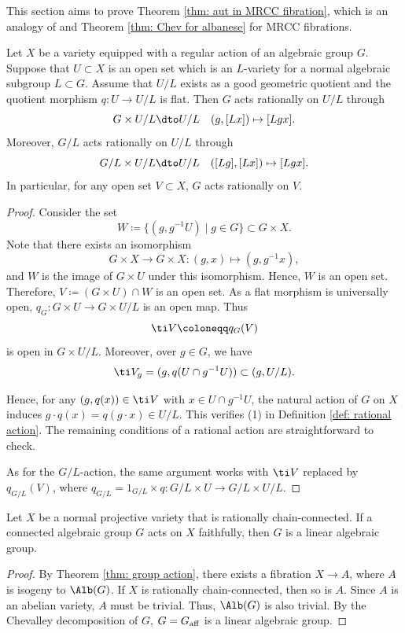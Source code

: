 \documentclass[11pt]{amsart}
\begin{document}
This section aims to prove Theorem \ref{thm: aut in MRCC fibration}, which is an analogy of \cite[Theorem 2]{Mat63} and Theorem \ref{thm: Chev for albanese} for MRCC fibrations.

\begin{lemma}\label{lem: rational action on open set}
Let $X$ be a variety equipped with a regular action of an algebraic group $G$. Suppose that $U\subset X$ is an open set which is an $L$-variety for a normal algebraic subgroup $L\subset G$. Assume that $U/L$ exists as a good geometric quotient and the quotient morphism $q: U \to U/L$ is flat. Then $G$ acts rationally on $U/L$ through
\[
G \times U/L \dto U/L \quad (g, [Lx]) \mapsto [Lgx]. 
\]
Moreover, $G/L$ acts rationally on $U/L$ through
\[
G/L \times U/L \dto U/L \quad ([Lg], [Lx]) \mapsto [Lgx]. 
\]
In particular, for any open set $V \subset X$, $G$ acts rationally on $V$.
\end{lemma}
\begin{proof}
Consider the set
\[
W \coloneqq \{(g, g^{-1}U) \mid g\in G\} \subset G \times X.
\] Note that there exists an isomorphism
\[
G \times X \to G \times X: (g, x) \mapsto (g, g^{-1}x),
\] and $W$ is the image of $G \times U$ under this isomorphism. Hence, $W$ is an open set. Therefore, $V \coloneqq (G \times U) \cap W$ is an open set. As a flat morphism is universally open, $q_G: G \times U \to G \times U/L$ is an open map. Thus
\[
\ti V \coloneqq q_G(V)
\] is open in $G \times U/L$. Moreover, over $g\in G$, we have
\[
\ti V_g = (g, q(U \cap g^{-1} U)) \subset (g, U/L).
\]

Hence, for any $(g, q(x)) \in \ti V$ with $x\in U\cap g^{-1}U$, the natural action of $G$ on $X$ induces $g\cdot q(x)=q(g\cdot x) \in U/L$. This verifies  (1) in Definition \ref{def: rational action}. The remaining conditions of a rational action are straightforward to check.

As for the $G/L$-action, the same argument works with $\ti V$ replaced by $q_{G/L}(V)$, where $q_{G/L}=1_{G/L} \times q: G/L \times U \to G/L \times U/L$.
\end{proof}

\begin{lemma}\label{lem: action on RCC variety}
    Let $X$ be a normal projective variety that is rationally chain-connected. If a connected algebraic group $G$ acts on $X$ faithfully, then $G$ is a linear algebraic group.
\end{lemma}
    \begin{proof}
        By Theorem \ref{thm: group action}, there exists a fibration $X \to A$, where $A$ is isogeny to $\Alb(G)$. If $X$ is rationally chain-connected, then so is $A$. Since $A$ is an abelian variety, $A$ must be trivial. Thus, $\Alb(G)$ is also trivial. By the Chevalley decomposition of $G$, $G= G_{\rm aff}$ is a linear algebraic group.
    \end{proof}
\end{document}

